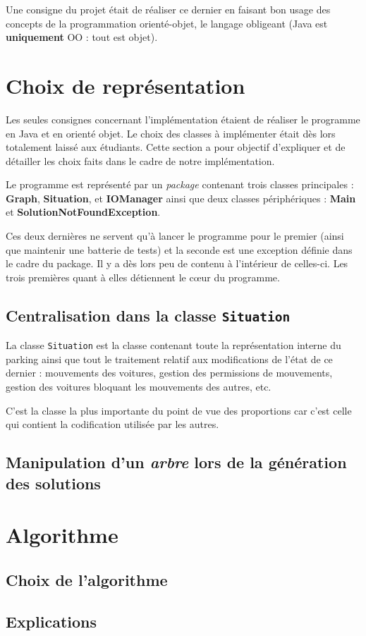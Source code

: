 \documentclass{article}
\begin{document}
        Une consigne du projet était de réaliser ce dernier en faisant bon usage des concepts de la programmation orienté-objet, le langage
        obligeant (Java est \textbf{uniquement} OO : tout est objet).

\section{Choix de représentation}
    Les seules consignes concernant l'implémentation étaient de réaliser le programme en Java et en orienté objet. Le choix des classes à implémenter était
    dès lors totalement laissé aux étudiants. Cette section a pour objectif d'expliquer et de détailler les choix faits dans le cadre de notre implémentation.

    Le programme est représenté par un \textit{package} contenant trois classes principales : \textbf{Graph}, \textbf{Situation}, et \textbf{IOManager}
    ainsi que deux classes périphériques : \textbf{Main} et \textbf{SolutionNotFoundException}.

    Ces deux dernières ne servent qu'à lancer le programme pour le premier (ainsi que maintenir une batterie de tests) et la seconde est une exception
    définie dans le cadre du package. Il y a dès lors peu de contenu à l'intérieur de celles-ci. Les trois premières quant à elles détiennent le cœur du
    programme.

    \subsection{Centralisation dans la classe \texttt{Situation}}
        La classe \texttt{Situation} est la classe contenant toute la représentation interne du parking ainsi que tout le traitement relatif aux
        modifications de l'état de ce dernier : mouvements des voitures, gestion des permissions de mouvements, gestion des voitures bloquant
        les mouvements des autres, etc.

        C'est la classe la plus importante du point de vue des proportions car c'est celle qui contient la codification utilisée par les autres.

    \subsection{Manipulation d'un \textit{arbre} lors de la génération des solutions}

\section{Algorithme}
    \subsection{Choix de l'algorithme}
    \subsection{Explications}
\end{document}
